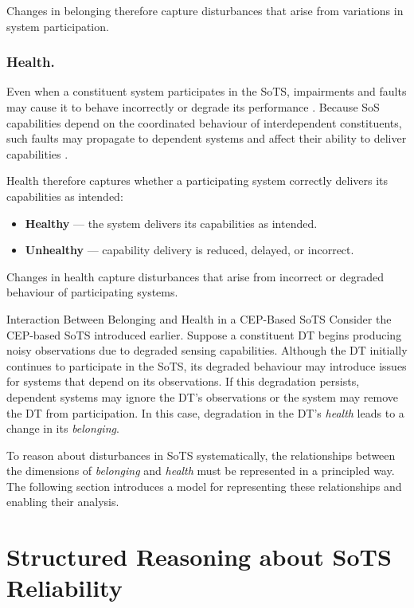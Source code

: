 Changes in belonging therefore capture disturbances that arise from variations in system participation.

\subsubsection{Health.}
Even when a constituent system participates in the SoTS, impairments and faults may cause it to behave incorrectly or degrade its performance \cite{abbott1990resourceful}. Because SoS capabilities depend on the coordinated behaviour of interdependent constituents, such faults may propagate to dependent systems and affect their ability to deliver capabilities \cite{ferreira2024framework,avizienis2004basic}.

Health therefore captures whether a participating system correctly delivers its capabilities as intended:

\begin{itemize}
    \item \textbf{Healthy} --- the system delivers its capabilities as intended.
    \item \textbf{Unhealthy} --- capability delivery is reduced, delayed, or incorrect.
\end{itemize}

Changes in health capture disturbances that arise from incorrect or degraded behaviour of participating systems.

\begin{runningexample}{Interaction Between Belonging and Health in a CEP-Based SoTS}
Consider the CEP-based SoTS introduced earlier. Suppose a constituent DT begins producing noisy observations due to degraded sensing capabilities. Although the DT initially continues to participate in the SoTS, its degraded behaviour may introduce issues for systems that depend on its observations. If this degradation persists, dependent systems may ignore the DT's observations or the system may remove the DT from participation. In this case, degradation in the DT's \emph{health} leads to a change in its \emph{belonging}.
\end{runningexample}

To reason about disturbances in SoTS systematically, the relationships between the dimensions of \emph{belonging} and \emph{health} must be represented in a principled way. The following section introduces a model for representing these relationships and enabling their analysis.


\section{Structured Reasoning about SoTS Reliability}\label{sec:structured-reasoning}

